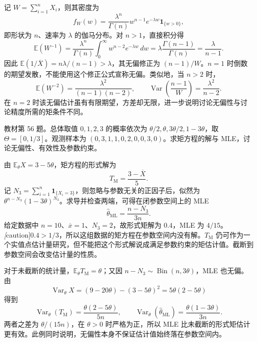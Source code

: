\begin{solve}
记 $W=\sum_{i=1}^nX_i$，则其密度为
\[
  f_W(w)=\frac{\lambda^n}{\Gamma(n)}
              w^{n-1}e^{-\lambda w}\mathbf1_{\{w>0\}},
\]
即形状为 $n$、速率为 $\lambda$ 的伽马分布。对 $n>1$，直接积分得
\[
  \mathbb E(W^{-1})
    =\frac{\lambda^n}{\Gamma(n)}
       \int_0^\infty w^{n-2}e^{-\lambda w}\,dw
    =\lambda\frac{\Gamma(n-1)}{\Gamma(n)}
    =\frac{\lambda}{n-1}.
\]
因此 $\mathbb E(1/\overline X)=n\lambda/(n-1)>\lambda$，其无偏修正为 $(n-1)/W$。$n=1$ 时倒数的期望发散，不能使用这个修正公式宣称无偏。类似地，当 $n>2$ 时，
\[
  \mathbb E(W^{-2})=\frac{\lambda^2}{(n-1)(n-2)},\qquad
  \operatorname{Var}\!\left(\frac{n-1}{W}\right)
      =\frac{\lambda^2}{n-2}.
\]
在 $n=2$ 时该无偏估计虽有有限期望，方差却无限，进一步说明讨论无偏性与讨论精度所需的矩条件不同。
\end{solve}

\begin{example}
\label{ex:study-ch6-ex56}
教材第 56 题。总体取值 $0,1,2,3$ 的概率依次为 $\theta/2,\theta,3\theta/2,1-3\theta$，取 $\Theta=[0,1/3]$。观测样本为 $(0,3,1,1,0,2,0,0,3,0)$。求矩方程的解与 MLE，讨论无偏性、有效性及参数约束。
\end{example}

\begin{solve}
由 $\mathbb E_\theta X=3-5\theta$，矩方程的形式解为
\[
  T_{\mathrm M}=\frac{3-\overline X}{5}.
\]
记 $N_3=\sum_{i=1}^n\mathbf1_{\{X_i=3\}}$，则忽略与参数无关的正因子后，似然为 $\theta^{n-N_3}(1-3\theta)^{N_3}$。求导并检查两端，可得在闭参数空间上的 MLE
\[
  \widehat\theta_{\mathrm{ML}}=\frac{n-N_3}{3n}.
\]
给定数据中 $n=10$、$\overline x=1$、$N_3=2$，故形式矩解为 $0.4$，MLE 为 $4/15$。\emph[caution]{$0.4>1/3$，所以这组数据的矩方程在参数空间内没有解。}$T_{\mathrm M}$ 仍可作为一个实值点估计量研究，但不能把这个形式解说成满足参数约束的矩估计值。截断到参数空间会改变估计量的性质。

对于未截断的统计量，$\mathbb E_\theta T_{\mathrm M}=\theta$；又因 $n-N_3\sim\operatorname{Bin}(n,3\theta)$，MLE 也无偏。由
\[
  \operatorname{Var}_\theta X
    =(9-20\theta)-(3-5\theta)^2
    =5\theta(2-5\theta)
\]
得到
\[
  \operatorname{Var}_\theta(T_{\mathrm M})
      =\frac{\theta(2-5\theta)}{5n},\qquad
  \operatorname{Var}_\theta(\widehat\theta_{\mathrm{ML}})
      =\frac{\theta(1-3\theta)}{3n}.
\]
两者之差为 $\theta/(15n)$，在 $\theta>0$ 时严格为正，所以 MLE 比未截断的形式矩估计更有效。此例同时说明，无偏性本身不保证估计值始终落在参数空间内。
\end{solve}

